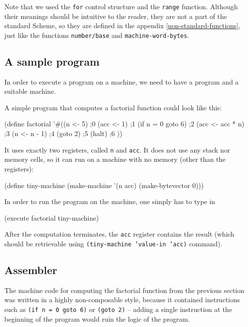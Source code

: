 Note that we used the \texttt{for} control structure and the
\texttt{range} function. Although their meanings should be
intuitive to the reader, they are not a part of the standard
Scheme, so they are defined in the appendix
\ref{non-standard-functions}, just like the functions
\texttt{number/base} and \texttt{machine-word-bytes}.

\subsection{A sample program}

In order to execute a program on a machine, we need to have
a program and a suitable machine.

A simple program that computes a factorial function could
look like this:

\begin{Snippet}
(define factorial
  '#((n <- 5)            ;0
     (acc <- 1)          ;1
     (if n = 0 goto 6)   ;2
     (acc <- acc * n)    ;3
     (n <- n - 1)        ;4
     (goto 2)            ;5
     (halt)              ;6
     ))
\end{Snippet}

It uses exactly two registers, called \texttt{n} and \texttt{acc}.
It does not use any stack nor memory cells, so it can run on
a machine with no memory (other than the registers):

\begin{Snippet}
(define tiny-machine (make-machine '(n acc) (make-bytevector 0)))
\end{Snippet}

In order to run the program on the machine, one simply has to
type in

\begin{Snippet}
(execute factorial tiny-machine)
\end{Snippet}

After the computation terminates, the \texttt{acc} register
contains the result (which should be retrievable using
\texttt{(tiny-machine 'value-in 'acc)} command).

\subsection{Assembler}

The machine code for computing the factorial function from the
previous section was written in a highly non-composable style,
because it contained instructions such as \texttt{(if n = 0 goto 6)}
or \texttt{(goto 2)} -- adding a single instruction at the beginning
of the program would ruin the logic of the program.

